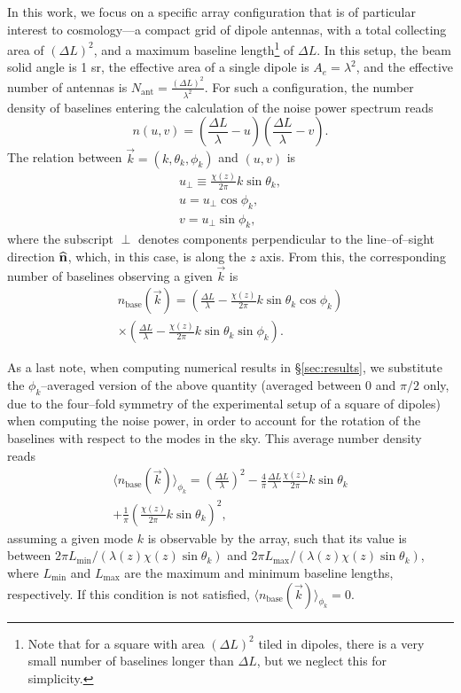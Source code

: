 \documentclass[aps,prd,twocolumn,floatfix,showpacs,superscriptaddress,nofootinbib]{revtex4-1}
\newcommand{\beq}{\begin{equation}}
\newcommand{\eeq}{\end{equation}}
\newcommand{\bga}{\begin{gathered}}
\newcommand{\ega}{\end{gathered}}
\begin{document}
In this work, we focus on a specific array configuration that is of particular interest to cosmology---a compact grid of dipole antennas, with a total collecting area of $(\Delta L)^2$, and a maximum baseline length\footnote{Note that for a square with area $(\Delta L)^2$ tiled in dipoles, there is a very small number of baselines longer than $\Delta L$, but we neglect this for simplicity.} of $\Delta L$. In this setup, the beam solid angle is 1 sr, the effective area of a single dipole is $A_e = \lambda^2$, and the effective number of antennas is $N_\text{ant} = \frac{(\Delta L)^2}{\lambda^2}$. For such a configuration, the number density of baselines entering the calculation of the noise power spectrum reads
\beq
n(u,v) = (\frac{\Delta L}{\lambda} - u)(\frac{\Delta L}{\lambda} - v).
\label{eq:nuv_fftt}
\eeq
The relation between $\vec k=(k,\theta_k,\phi_k)$ and $(u,v)$ is
\beq
\bga
u_\perp \equiv \frac{\chi(z)}{2\pi}k\sin\theta_k,\\
u = u_\perp \cos\phi_k,\\
v = u_\perp \sin\phi_k,
\ega
\label{eq:k_uv}
\eeq
where the subscript $\perp$ denotes components perpendicular to the line--of--sight direction ${\bf{\widehat n}}$, which, in this case, is along the $z$ axis. From this, the corresponding number of baselines observing a given $\vec k$ is
\beq
\bga
n_\text{base}(\vec k) = (\frac{\Delta L}{\lambda} - \frac{\chi(z)}{2\pi}k\sin\theta_k\cos\phi_k)\\\times (\frac{\Delta L}{\lambda} - \frac{\chi(z)}{2\pi}k\sin\theta_k\sin\phi_k).
\ega
\label{eq:nk_fftt}
\eeq

As a last note, when computing numerical results in \S\ref{sec:results}, we substitute the $\phi_k$--averaged version of the above quantity (averaged between $0$ and $\pi/2$ only, due to the four--fold symmetry of the experimental setup of a square of dipoles) when computing the noise power, in order to account for the rotation of the baselines with respect to the modes in the sky. This average number density reads
\beq
\bga
\langle n_\text{base}(\vec k) \rangle_{\phi_k}= \left(\frac{\Delta L}{\lambda}\right)^2 -\frac{4}{\pi}\frac{\Delta L}{\lambda}\frac{\chi(z)}{2\pi}k\sin\theta_k \\+ \frac{1}{\pi}\left(\frac{\chi(z)}{2\pi}k\sin\theta_k\right)^2,
\ega
\label{eq:nk_fftt_mean}
\eeq
assuming a given mode $k$ is observable by the array, such that its value is between $2\pi L_\text{min}/(\lambda(z)\chi(z)\sin\theta_k)$ and $2\pi L_\text{max}/(\lambda(z)\chi(z)\sin\theta_k)$, where $L_\text{min}$ and $L_\text{max}$ are the maximum and minimum baseline lengths, respectively. If this condition is not satisfied, $\langle n_\text{base}(\vec k) \rangle_{\phi_k}=0$.
\end{document}
